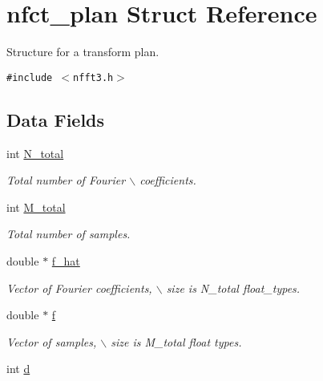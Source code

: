 \hypertarget{structnfct__plan}{
\section{nfct\_\-plan Struct Reference}
\label{structnfct__plan}
}
Structure for a transform plan.  


{\tt \#include $<$nfft3.h$>$}

\subsection*{Data Fields}
\begin{CompactItemize}
\item 
\hypertarget{structnfct__plan_o0}{
int \hyperlink{structnfct__plan_o0}{N\_\-total}}
\label{structnfct__plan_o0}

\begin{CompactList}\small\item\em Total number of Fourier $\backslash$ coefficients. \item\end{CompactList}\item 
\hypertarget{structnfct__plan_o1}{
int \hyperlink{structnfct__plan_o1}{M\_\-total}}
\label{structnfct__plan_o1}

\begin{CompactList}\small\item\em Total number of samples. \item\end{CompactList}\item 
\hypertarget{structnfct__plan_o2}{
double $\ast$ \hyperlink{structnfct__plan_o2}{f\_\-hat}}
\label{structnfct__plan_o2}

\begin{CompactList}\small\item\em Vector of Fourier coefficients, $\backslash$ size is N\_\-total float\_\-types. \item\end{CompactList}\item 
\hypertarget{structnfct__plan_o3}{
double $\ast$ \hyperlink{structnfct__plan_o3}{f}}
\label{structnfct__plan_o3}

\begin{CompactList}\small\item\em Vector of samples, $\backslash$ size is M\_\-total float types. \item\end{CompactList}\item 
\hypertarget{structnfct__plan_o4}{
int \hyperlink{structnfct__plan_o4}{d}}
\label{structnfct__plan_o4}


\end{CompactItemize}
